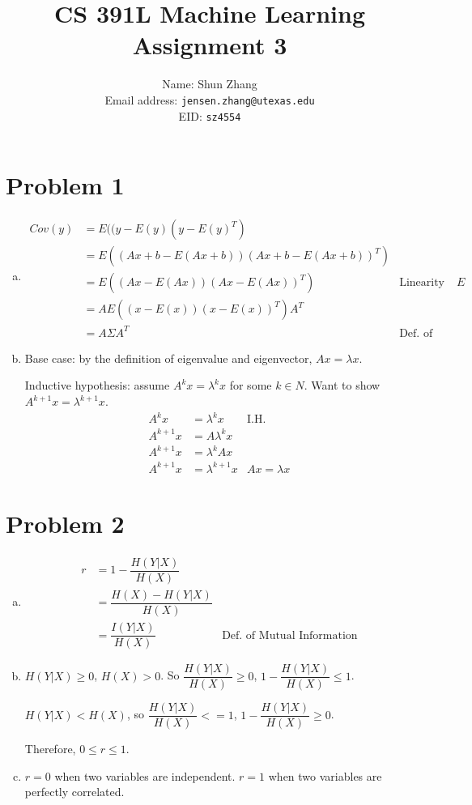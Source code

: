 \documentclass[10pt]{article}
\title{CS 391L Machine Learning Assignment 3}
\author{Name: Shun Zhang\\
Email address: \texttt{jensen.zhang@utexas.edu}\\
EID: \texttt{sz4554}}
\date{}
\begin{document}
\maketitle

\section*{Problem 1}

\begin{enumerate}[(a)]

\item \begin{align}
Cov(y) &= E((y - E(y)(y - E(y)^T)\\
&= E((Ax + b - E(Ax + b))(Ax + b - E(Ax + b))^T)\\
&= E((Ax - E(Ax))(Ax - E(Ax))^T) &\text{Linearity of $E$}\\
&= AE((x - E(x))(x - E(x))^T)A^T\\
&= A\Sigma A^T &\text{Def.\ of Cov.\ }
\end{align}

\item Base case: by the definition of eigenvalue and eigenvector, $Ax =
\lambda x$.

Inductive hypothesis: assume $A^k x = \lambda^k x$ for some $k \in N$.
Want to show $A^{k+1} x = \lambda^{k+1} x$.
\begin{align}
A^k x &= \lambda^k x &\text{I.H.}\\
A^{k+1} x &= A \lambda^k x\\
A^{k+1} x &= \lambda^k Ax\\
A^{k+1} x &= \lambda^{k+1} x &Ax = \lambda x
\end{align}

\end{enumerate}

\section*{Problem 2}

\begin{enumerate}[(a)]

\item 
\begin{align}
r &= 1 - \dfrac{H(Y|X)}{H(X)}\\
&= \dfrac{H(X) - H(Y|X)}{H(X)}\\
&= \dfrac{I(Y|X)}{H(X)} &\text{Def.\ of Mutual Information}
\end{align}

\item $H(Y|X) \geq 0$, $H(X) > 0$. So $\dfrac{H(Y|X)}{H(X)} \geq 0$,
$1 - \dfrac{H(Y|X)}{H(X)} \leq 1$.

$H(Y|X) < H(X)$, so $\dfrac{H(Y|X)}{H(X)} <= 1$, $1 -
\dfrac{H(Y|X)}{H(X)} \geq 0$.

Therefore, $0 \leq r \leq 1$.

\item $r = 0$ when two variables are independent. $r = 1$ when two
variables are perfectly correlated.

\end{enumerate}
\end{document}
